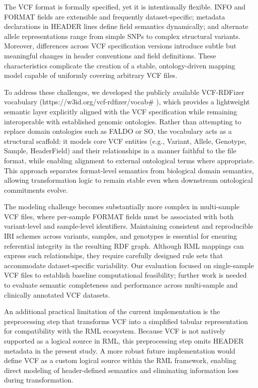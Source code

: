 \documentclass[unnumsec,webpdf,contemporary,large]{oup-authoring-template}
\begin{document}
The VCF format is formally specified, yet it is intentionally flexible. INFO and FORMAT fields are extensible and frequently dataset-specific; metadata declarations in HEADER lines define field semantics dynamically; and alternate allele representations range from simple SNPs to complex structural variants. 
Moreover, differences across VCF specification versions introduce subtle but meaningful changes in header conventions and field definitions. These characteristics complicate the creation of a stable, ontology-driven mapping model capable of uniformly covering arbitrary VCF files.

To address these challenges, we developed the publicly available VCF-RDFizer vocabulary (https://w3id.org/vcf-rdfizer/vocab\#
), which provides a lightweight semantic layer explicitly aligned with the VCF specification while remaining interoperable with established genomic ontologies. 
Rather than attempting to replace domain ontologies such as FALDO or SO, the vocabulary acts as a structural scaffold: it models core VCF entities (e.g., Variant, Allele, Genotype, Sample, HeaderField) and their relationships in a manner faithful to the file format, while enabling alignment to external ontological terms where appropriate. 
This approach separates format-level semantics from biological domain semantics, allowing transformation logic to remain stable even when downstream ontological commitments evolve.

The modeling challenge becomes substantially more complex in multi-sample VCF files, where per-sample FORMAT fields must be associated with both variant-level and sample-level identifiers. 
Maintaining consistent and reproducible IRI schemes across variants, samples, and genotypes is essential for ensuring referential integrity in the resulting RDF graph. Although RML mappings can express such relationships, they require carefully designed rule sets that accommodate dataset-specific variability. 
Our evaluation focused on single-sample VCF files to establish baseline computational feasibility; further work is needed to evaluate semantic completeness and performance across multi-sample and clinically annotated VCF datasets.

An additional practical limitation of the current implementation is the preprocessing step that transforms VCF into a simplified tabular representation for compatibility with the RML ecosystem. 
Because VCF is not natively supported as a logical source in RML, this preprocessing step omits HEADER metadata in the present study. 
A more robust future implementation would define VCF as a custom logical source within the RML framework, enabling direct modeling of header-defined semantics and eliminating information loss during transformation.
\end{document}
